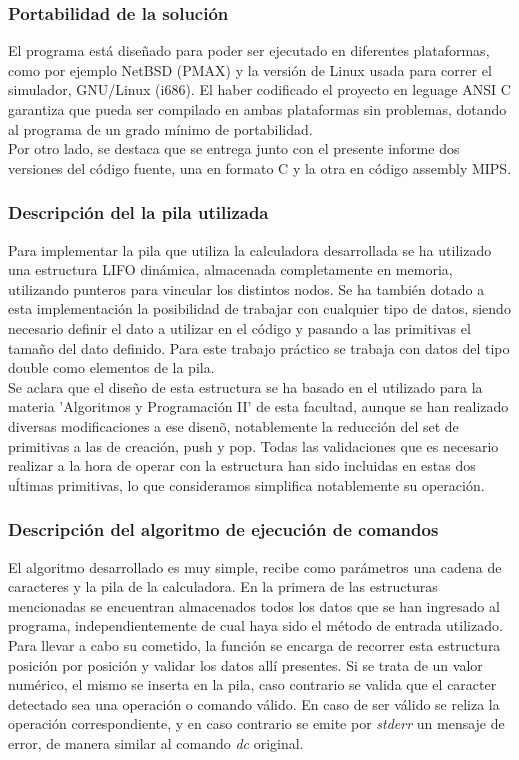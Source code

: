 \documentclass[a4paper,10pt]{article}
\begin{document}
\subsubsection{Portabilidad de la soluci\'on}
El programa est\'a dise\~nado para poder ser ejecutado en diferentes plataformas, como por ejemplo NetBSD (PMAX) y la versi\'on de Linux usada para correr el simulador, GNU/Linux (i686). El haber codificado el proyecto en leguage ANSI C garantiza que pueda ser compilado en ambas plataformas sin problemas, dotando al programa de un grado m\'inimo de portabilidad.\\
Por otro lado, se destaca que se entrega junto con el presente informe dos versiones del c\'odigo fuente, una en formato C y la otra en c\'odigo assembly MIPS.

\subsubsection{Descripci\'on del la pila utilizada}
Para implementar la pila que utiliza la calculadora desarrollada se ha utilizado una estructura LIFO din\'amica, almacenada completamente en memoria, utilizando punteros para vincular los distintos nodos. Se ha tambi\'en dotado a esta implementaci\'on la posibilidad de trabajar con cualquier tipo de datos, siendo necesario definir el dato a utilizar en el c\'odigo y pasando a las primitivas el tama\~no del dato definido. Para este trabajo pr\'actico se trabaja con datos del tipo double como elementos de la pila.\\
Se aclara que el dise\~no de esta estructura se ha basado en el utilizado para la materia 'Algoritmos y Programaci\'on II' de esta facultad, aunque se han realizado diversas modificaciones a ese disen\~o, notablemente la reducci\'on del set de primitivas a las de creaci\'on, push y pop. Todas las validaciones que es necesario realizar a la hora de operar con la estructura han sido incluidas en estas dos u\'ltimas primitivas, lo que consideramos simplifica notablemente su operaci\'on.

\subsubsection{Descripci\'on del algoritmo de ejecuci\'on de comandos}
El algoritmo desarrollado es muy simple, recibe como par\'ametros una cadena de caracteres y la pila de la calculadora. En la primera de las estructuras mencionadas se encuentran almacenados todos los datos que se han ingresado al programa, independientemente de cual haya sido el m\'etodo de entrada utilizado. Para llevar a cabo su cometido, la funci\'on se encarga de recorrer esta estructura posici\'on por posici\'on y validar los datos all\'i presentes. Si se trata de un valor num\'erico, el mismo se inserta en la pila, caso contrario se valida que el caracter detectado sea una operaci\'on o comando v\'alido. En caso de ser v\'alido se reliza la operaci\'on correspondiente, y en caso contrario se emite por \textit{stderr} un mensaje de error, de manera similar al comando \textit{dc} original.
\end{document}
